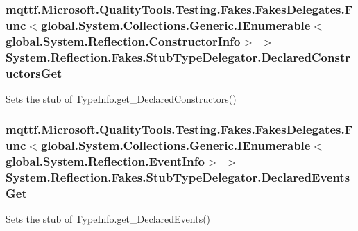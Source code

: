 \hypertarget{class_system_1_1_reflection_1_1_fakes_1_1_stub_type_delegator_ae98b96bcb5c23222fd320353152def86}{
\subsubsection[{Declared\-Constructors\-Get}]{\setlength{\rightskip}{0pt plus 5cm}mqttf.\-Microsoft.\-Quality\-Tools.\-Testing.\-Fakes.\-Fakes\-Delegates.\-Func$<$global.\-System.\-Collections.\-Generic.\-I\-Enumerable$<$global.\-System.\-Reflection.\-Constructor\-Info$>$ $>$ System.\-Reflection.\-Fakes.\-Stub\-Type\-Delegator.\-Declared\-Constructors\-Get}}\label{class_system_1_1_reflection_1_1_fakes_1_1_stub_type_delegator_ae98b96bcb5c23222fd320353152def86}


Sets the stub of Type\-Info.\-get\-\_\-\-Declared\-Constructors()

\hypertarget{class_system_1_1_reflection_1_1_fakes_1_1_stub_type_delegator_a379f761b749148ad270cdd878c4ce0a6}{
\subsubsection[{Declared\-Events\-Get}]{\setlength{\rightskip}{0pt plus 5cm}mqttf.\-Microsoft.\-Quality\-Tools.\-Testing.\-Fakes.\-Fakes\-Delegates.\-Func$<$global.\-System.\-Collections.\-Generic.\-I\-Enumerable$<$global.\-System.\-Reflection.\-Event\-Info$>$ $>$ System.\-Reflection.\-Fakes.\-Stub\-Type\-Delegator.\-Declared\-Events\-Get}}\label{class_system_1_1_reflection_1_1_fakes_1_1_stub_type_delegator_a379f761b749148ad270cdd878c4ce0a6}


Sets the stub of Type\-Info.\-get\-\_\-\-Declared\-Events()

